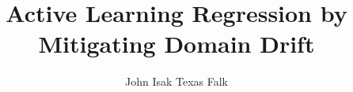 \makeatletter
\renewcommand {\@degree@string} {Master of Research in Financial Computing}
\makeatother

\title{Active Learning Regression by Mitigating Domain Drift}
\author{John Isak Texas Falk}

\maketitle
\makedeclaration

